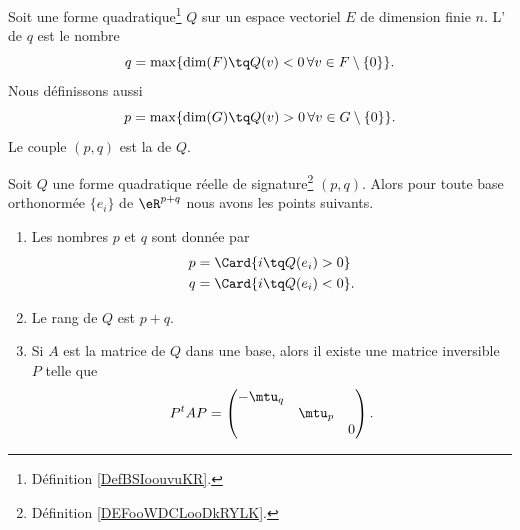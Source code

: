 \begin{definition}       \label{DEFooWDCLooDkRYLK}
    Soit une forme quadratique\footnote{Définition \ref{DefBSIoouvuKR}.} \( Q\) sur un espace vectoriel \( E\) de dimension finie \( n\). L' de \( q\) est le nombre
    \begin{equation}
        q=\max\{ \dim(F)\tq Q(v)<0\,\forall v\in F\setminus\{ 0 \} \}.
    \end{equation}
    Nous définissons aussi
    \begin{equation}
        p=\max\{ \dim(G)\tq Q(v)>0\,\forall v\in G\setminus\{ 0 \} \}.
    \end{equation}
    Le couple \( (p,q)\) est la  de \( Q\).
\end{definition}

\begin{theorem}   \label{ThoQFVsBCk}
    Soit $Q$ une forme quadratique réelle de signature\footnote{Définition \ref{DEFooWDCLooDkRYLK}.} \( (p,q)\). Alors pour toute base orthonormée \( \{ e_i \}\) de \( \eR^{p+q}\) nous avons les points suivants.
    \begin{enumerate}
        \item
            Les nombres \( p\) et \( q\) sont donnée par 
    \begin{subequations}
        \begin{align}
            p&=\Card\{ i\tq Q(e_i)>0 \}\\
            q&=\Card\{ i\tq Q(e_i)<0 \}.
        \end{align}
    \end{subequations}
\item
    Le rang de \( Q\) est \( p+q\).
\item
    Si \( A\) est la matrice de \( Q\) dans une base, alors il existe une matrice inversible \( P\) telle que
    \begin{equation}
        P^tAP=\begin{pmatrix}
            -\mtu_q    &       &       \\
                &   \mtu_p    &       \\
                &       &   0
        \end{pmatrix}.
    \end{equation}
    \end{enumerate}
\end{theorem}

